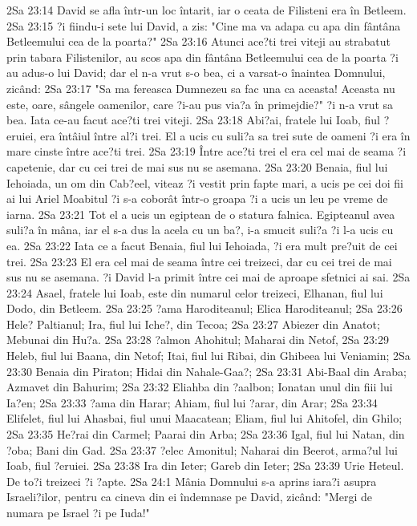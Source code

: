 2Sa 23:14  David se afla într-un loc întarit, iar o ceata de Filisteni era în Betleem.
2Sa 23:15  ?i fiindu-i sete lui David, a zis: "Cine ma va adapa cu apa din fântâna Betleemului cea de la poarta?"
2Sa 23:16  Atunci ace?ti trei viteji au strabatut prin tabara Filistenilor, au scos apa din fântâna Betleemului cea de la poarta ?i au adus-o lui David; dar el n-a vrut s-o bea, ci a varsat-o înaintea Domnului, zicând:
2Sa 23:17  "Sa ma fereasca Dumnezeu sa fac una ca aceasta! Aceasta nu este, oare, sângele oamenilor, care ?i-au pus via?a în primejdie?" ?i n-a vrut sa bea. Iata ce-au facut ace?ti trei viteji.
2Sa 23:18  Abi?ai, fratele lui Ioab, fiul ?eruiei, era întâiul între al?i trei. El a ucis cu suli?a sa trei sute de oameni ?i era în mare cinste între ace?ti trei.
2Sa 23:19  Între ace?ti trei el era cel mai de seama ?i capetenie, dar cu cei trei de mai sus nu se asemana.
2Sa 23:20  Benaia, fiul lui Iehoiada, un om din Cab?eel, viteaz ?i vestit prin fapte mari, a ucis pe cei doi fii ai lui Ariel Moabitul ?i s-a coborât într-o groapa ?i a ucis un leu pe vreme de iarna.
2Sa 23:21  Tot el a ucis un egiptean de o statura falnica. Egipteanul avea suli?a în mâna, iar el s-a dus la acela cu un ba?, i-a smucit suli?a ?i l-a ucis cu ea.
2Sa 23:22  Iata ce a facut Benaia, fiul lui Iehoiada, ?i era mult pre?uit de cei trei.
2Sa 23:23  El era cel mai de seama între cei treizeci, dar cu cei trei de mai sus nu se asemana. ?i David l-a primit între cei mai de aproape sfetnici ai sai.
2Sa 23:24  Asael, fratele lui Ioab, este din numarul celor treizeci, Elhanan, fiul lui Dodo, din Betleem.
2Sa 23:25  ?ama Haroditeanul; Elica Haroditeanul;
2Sa 23:26  Hele? Paltianul; Ira, fiul lui Iche?, din Tecoa;
2Sa 23:27  Abiezer din Anatot; Mebunai din Hu?a.
2Sa 23:28  ?almon Ahohitul; Maharai din Netof,
2Sa 23:29  Heleb, fiul lui Baana, din Netof; Itai, fiul lui Ribai, din Ghibeea lui Veniamin;
2Sa 23:30  Benaia din Piraton; Hidai din Nahale-Gaa?;
2Sa 23:31  Abi-Baal din Araba; Azmavet din Bahurim;
2Sa 23:32  Eliahba din ?aalbon; Ionatan unul din fiii lui Ia?en;
2Sa 23:33  ?ama din Harar; Ahiam, fiul lui ?arar, din Arar;
2Sa 23:34  Elifelet, fiul lui Ahasbai, fiul unui Maacatean; Eliam, fiul lui Ahitofel, din Ghilo;
2Sa 23:35  He?rai din Carmel; Paarai din Arba;
2Sa 23:36  Igal, fiul lui Natan, din ?oba; Bani din Gad.
2Sa 23:37  ?elec Amonitul; Naharai din Beerot, arma?ul lui Ioab, fiul ?eruiei.
2Sa 23:38  Ira din Ieter; Gareb din Ieter;
2Sa 23:39  Urie Heteul. De to?i treizeci ?i ?apte.
2Sa 24:1  Mânia Domnului s-a aprins iara?i asupra Israeli?ilor, pentru ca cineva din ei îndemnase pe David, zicând: "Mergi de numara pe Israel ?i pe Iuda!"
